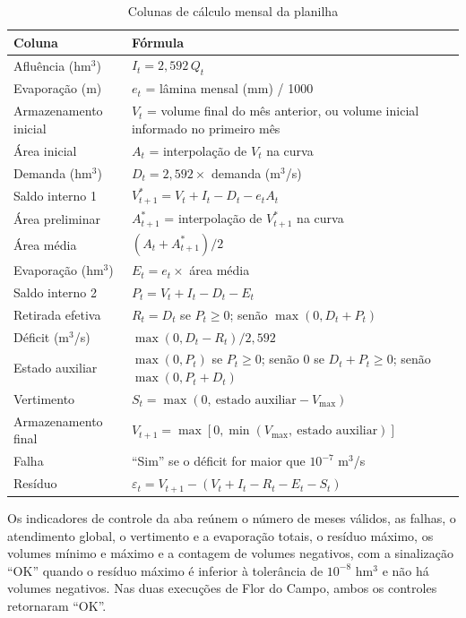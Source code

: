 \begin{table}[!htbp]
    \captionsetup{width=15cm}
    \caption{Colunas de cálculo mensal da planilha}
    \label{tab:colunas-planilha}
    \centering
    \scriptsize
    \begin{tabular}{p{3.6cm}p{10.6cm}}
        \toprule
        Coluna & Fórmula \\
        \midrule
        Afluência (hm$^3$) & $I_t = 2{,}592\,Q_t$ \\
        Evaporação (m) & $e_t$ = lâmina mensal (mm) / 1000 \\
        Armazenamento inicial & $V_t$ = volume final do mês anterior, ou volume inicial informado no primeiro mês \\
        Área inicial & $A_t$ = interpolação de $V_t$ na curva \\
        Demanda (hm$^3$) & $D_t = 2{,}592 \times$ demanda (m$^3$/s) \\
        Saldo interno 1 & $V^{*}_{t+1} = V_t + I_t - D_t - e_t A_t$ \\
        Área preliminar & $A^{*}_{t+1}$ = interpolação de $V^{*}_{t+1}$ na curva \\
        Área média & $(A_t + A^{*}_{t+1})/2$ \\
        Evaporação (hm$^3$) & $E_t = e_t \times$ área média \\
        Saldo interno 2 & $P_t = V_t + I_t - D_t - E_t$ \\
        Retirada efetiva & $R_t = D_t$ se $P_t \geq 0$; senão $\max(0, D_t + P_t)$ \\
        Déficit (m$^3$/s) & $\max(0, D_t - R_t)/2{,}592$ \\
        Estado auxiliar & $\max(0, P_t)$ se $P_t \geq 0$; senão $0$ se $D_t + P_t \geq 0$; senão $\max(0, P_t + D_t)$ \\
        Vertimento & $S_t = \max(0,\ \text{estado auxiliar} - V_{\max})$ \\
        Armazenamento final & $V_{t+1} = \max[0, \min(V_{\max},\ \text{estado auxiliar})]$ \\
        Falha & ``Sim'' se o déficit for maior que $10^{-7}$ m$^3$/s \\
        Resíduo & $\varepsilon_t = V_{t+1} - (V_t + I_t - R_t - E_t - S_t)$ \\
        \bottomrule
    \end{tabular}
\end{table}

Os indicadores de controle da aba reúnem o número de meses válidos, as falhas, o atendimento global, o vertimento e a evaporação totais, o resíduo máximo, os volumes mínimo e máximo e a contagem de volumes negativos, com a sinalização ``OK'' quando o resíduo máximo é inferior à tolerância de $10^{-8}$ hm$^3$ e não há volumes negativos. Nas duas execuções de Flor do Campo, ambos os controles retornaram ``OK''.

